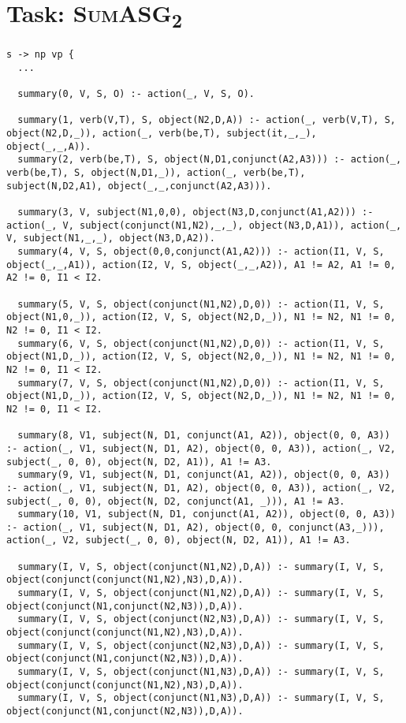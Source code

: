 \vspace{5pt}

\section{Task: \textsc{SumASG\textsubscript{2}}}
\label{sec:appendix_asg_2}

\begin{lstlisting}
s -> np vp {
  ...

  summary(0, V, S, O) :- action(_, V, S, O).

  summary(1, verb(V,T), S, object(N2,D,A)) :- action(_, verb(V,T), S, object(N2,D,_)), action(_, verb(be,T), subject(it,_,_), object(_,_,A)).
  summary(2, verb(be,T), S, object(N,D1,conjunct(A2,A3))) :- action(_, verb(be,T), S, object(N,D1,_)), action(_, verb(be,T), subject(N,D2,A1), object(_,_,conjunct(A2,A3))).

  summary(3, V, subject(N1,0,0), object(N3,D,conjunct(A1,A2))) :- action(_, V, subject(conjunct(N1,N2),_,_), object(N3,D,A1)), action(_, V, subject(N1,_,_), object(N3,D,A2)).
  summary(4, V, S, object(0,0,conjunct(A1,A2))) :- action(I1, V, S, object(_,_,A1)), action(I2, V, S, object(_,_,A2)), A1 != A2, A1 != 0, A2 != 0, I1 < I2.

  summary(5, V, S, object(conjunct(N1,N2),D,0)) :- action(I1, V, S, object(N1,0,_)), action(I2, V, S, object(N2,D,_)), N1 != N2, N1 != 0, N2 != 0, I1 < I2.
  summary(6, V, S, object(conjunct(N1,N2),D,0)) :- action(I1, V, S, object(N1,D,_)), action(I2, V, S, object(N2,0,_)), N1 != N2, N1 != 0, N2 != 0, I1 < I2.
  summary(7, V, S, object(conjunct(N1,N2),D,0)) :- action(I1, V, S, object(N1,D,_)), action(I2, V, S, object(N2,D,_)), N1 != N2, N1 != 0, N2 != 0, I1 < I2.

  summary(8, V1, subject(N, D1, conjunct(A1, A2)), object(0, 0, A3)) :- action(_, V1, subject(N, D1, A2), object(0, 0, A3)), action(_, V2, subject(_, 0, 0), object(N, D2, A1)), A1 != A3.
  summary(9, V1, subject(N, D1, conjunct(A1, A2)), object(0, 0, A3)) :- action(_, V1, subject(N, D1, A2), object(0, 0, A3)), action(_, V2, subject(_, 0, 0), object(N, D2, conjunct(A1, _))), A1 != A3.
  summary(10, V1, subject(N, D1, conjunct(A1, A2)), object(0, 0, A3)) :- action(_, V1, subject(N, D1, A2), object(0, 0, conjunct(A3,_))), action(_, V2, subject(_, 0, 0), object(N, D2, A1)), A1 != A3.

  summary(I, V, S, object(conjunct(N1,N2),D,A)) :- summary(I, V, S, object(conjunct(conjunct(N1,N2),N3),D,A)).
  summary(I, V, S, object(conjunct(N1,N2),D,A)) :- summary(I, V, S, object(conjunct(N1,conjunct(N2,N3)),D,A)).
  summary(I, V, S, object(conjunct(N2,N3),D,A)) :- summary(I, V, S, object(conjunct(conjunct(N1,N2),N3),D,A)).
  summary(I, V, S, object(conjunct(N2,N3),D,A)) :- summary(I, V, S, object(conjunct(N1,conjunct(N2,N3)),D,A)).
  summary(I, V, S, object(conjunct(N1,N3),D,A)) :- summary(I, V, S, object(conjunct(conjunct(N1,N2),N3),D,A)).
  summary(I, V, S, object(conjunct(N1,N3),D,A)) :- summary(I, V, S, object(conjunct(N1,conjunct(N2,N3)),D,A)).


\end{lstlisting}
